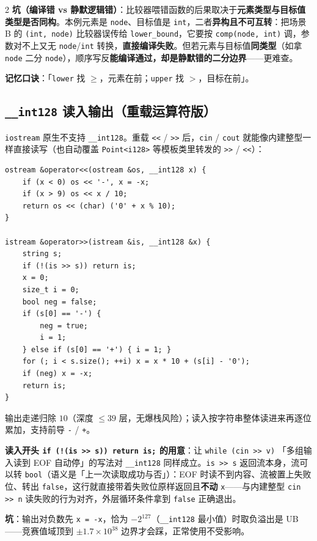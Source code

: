 \begin{multicols*}{2}
		\textbf{坑（编译错 vs 静默逻辑错）}：比较器喂错函数的后果取决于\textbf{元素类型与目标值类型是否同构}。本例元素是 \texttt{node}、目标值是 \texttt{int}，二者\textbf{异构且不可互转}：把场景 B 的 \texttt{(int, node)} 比较器误传给 \texttt{lower\_bound}，它要按 \texttt{comp(node, int)} 调，参数对不上又无 \texttt{node}/\texttt{int} 转换，\textbf{直接编译失败}。但若元素与目标值\textbf{同类型}（如拿 \texttt{node} 二分 \texttt{node}），顺序写反\textbf{能编译通过，却是静默错的二分边界}——更难查。

		\textbf{记忆口诀}：「\texttt{lower} 找 $\ge$，元素在前；\texttt{upper} 找 $>$，目标在前」。

		\subsection{\texttt{\_\_int128} 读入输出（重载运算符版）}

		\texttt{iostream} 原生不支持 \texttt{\_\_int128}。重载 \texttt{<<} / \texttt{>>} 后，\texttt{cin} / \texttt{cout} 就能像内建整型一样直接读写（也自动覆盖 \texttt{Point<i128>} 等模板类里转发的 \texttt{>>} / \texttt{<<}）：

		\begin{verbatim}
ostream &operator<<(ostream &os, __int128 x) {
	if (x < 0) os << '-', x = -x;
	if (x > 9) os << x / 10;
	return os << (char) ('0' + x % 10);
}

istream &operator>>(istream &is, __int128 &x) {
	string s;
	if (!(is >> s)) return is;
	x = 0;
	size_t i = 0;
	bool neg = false;
	if (s[0] == '-') {
		neg = true;
		i = 1;
	} else if (s[0] == '+') { i = 1; }
	for (; i < s.size(); ++i) x = x * 10 + (s[i] - '0');
	if (neg) x = -x;
	return is;
}
		\end{verbatim}

		输出走递归除 $10$（深度 $\le 39$ 层，无爆栈风险）；读入按字符串整体读进来再逐位累加，支持前导 \texttt{-} / \texttt{+}。

		\textbf{读入开头 \texttt{if (!(is >> s)) return is;} 的用意}：让 \texttt{while (cin >> v)} 「多组输入读到 EOF 自动停」的写法对 \texttt{\_\_int128} 同样成立。\texttt{is >> s} 返回流本身，流可以转 \texttt{bool}（语义是「上一次读取成功与否」）：EOF 时读不到内容、流被置上失败位、转出 \texttt{false}，这行就直接带着失败位原样返回且\textbf{不动} \texttt{x}——与内建整型 \texttt{cin >> n} 读失败的行为对齐，外层循环条件拿到 \texttt{false} 正确退出。

		\textbf{坑}：输出对负数先 \texttt{x = -x}，恰为 $-2^{127}$（\texttt{\_\_int128} 最小值）时取负溢出是 UB——竞赛值域顶到 $\pm 1.7 \times 10^{38}$ 边界才会踩，正常使用不受影响。


\end{multicols*}
